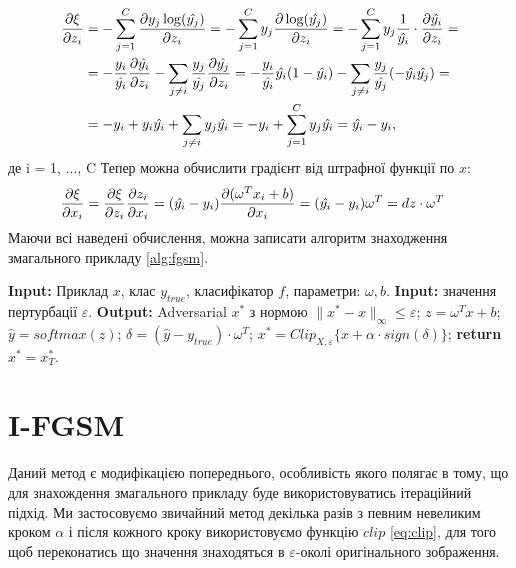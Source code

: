 \documentclass[a4paper,14pt]{extreport}
\renewcommand{\algorithmicrequire}{\textbf{Input: }}
\renewcommand{\algorithmicensure}{\textbf{Output: }}
\newcommand{\algorithmreturn}{\textbf{return }}
\newcommand{\tran}{^{T}}
\begin{document}
	\begin{align*}
		\pdv{\xi}{z_i} 
		&= 
		- \sum_{j=1}^{C} \pdv{ y_j \log (\hat{y_j})}{z_i} 
		=
		- \sum_{j=1}^{C} y_j \pdv{ \log (\hat{y_j})}{z_i} 
		= 
		- \sum_{j=1}^{C} y_j \frac{1}{\hat{y_i}} \cdot \pdv{\hat{y_i}}{z_i} 
		= \\& =
		- \frac{y_i}{\hat{y_i}} \pdv{\hat{y_i}}{z_i} - \sum_{j \neq i} \frac{y_j}{\hat{y_j}} \pdv{\hat{y_j}}{z_i} 
		= 
		-\frac{y_i}{\hat{y_i}} \hat{y_i} (1 - \hat{y_i}) - \sum_{j \neq i} \frac{y_j}{\hat{y_j}} (-\hat{y_i} \hat{y_j}) 
		= \\& =
		-y_i + y_i \hat{y_i} + \sum_{j \neq i} y_j \hat{y_i}
		= 
		-y_i + \sum_{j=1}^{C} y_j \hat{y_i} 
		=
		\hat{y_i} - y_i ,
	\end{align*}
	\endgroup
	де i = 1, ..., C
	\newline	
	Тепер можна обчислити градієнт від штрафної функції по $x$:
	\begin{align}
		\pdv{\xi}{x_i} 
		&=
		\pdv{\xi}{z_i} \pdv{z_i}{x_i} 
		=
		(\hat{y_i} - y_i) \pdv{(\omega\tran x_i+ b)}{x_i} 
		=
		(\hat{y_i} - y_i) \omega\tran 
		=
		dz \cdot \omega\tran
	\end{align}
	 Маючи всі наведені обчислення, можна записати алгоритм знаходження змагального прикладу \ref{alg:fgsm}.
	\begin{algorithm}
		\caption{$FGSM$}
		\label{alg:fgsm}
		\begin{algorithmic}[1]
			\State \algorithmicrequire{Приклад $x$, клас $y_{true}$, класифікатор $f$, параметри: $\omega, b$.}
			\State \algorithmicrequire{значення пертурбації $\varepsilon$.}
			\State \algorithmicensure{ Adversarial $x^{*}$ з нормою $\|x^{*} - x\|_{\infty} \leq \varepsilon $;}
			\State $z = \omega\tran x + b$;
			\State $\hat{y} = softmax(z)$;
			\State $\delta = (\hat{y} - y_{true}) \cdot \omega\tran$;
			\State $x^{*} = Clip_{X, \varepsilon} \big\{ x + \alpha \cdot sign( \delta ) \big\}$;
			\State \algorithmreturn{$x^{*} = x^{*}_{T}$}.
		\end{algorithmic}
	\end{algorithm}
	
	\section{I-FGSM}
	Даний метод є модифікацією попереднього, особливість якого полягає в тому, що для знахождення змагального прикладу буде використовуватись ітераційний підхід.	Ми застосовуємо звичайний метод декілька разів з певним невеликим кроком $\alpha$ і після кожного кроку використовуємо функцію $clip$ \ref{eq:clip}, для того щоб переконатись що значення знаходяться в $\varepsilon$-околі оригінального зображення.
	
\end{document}
